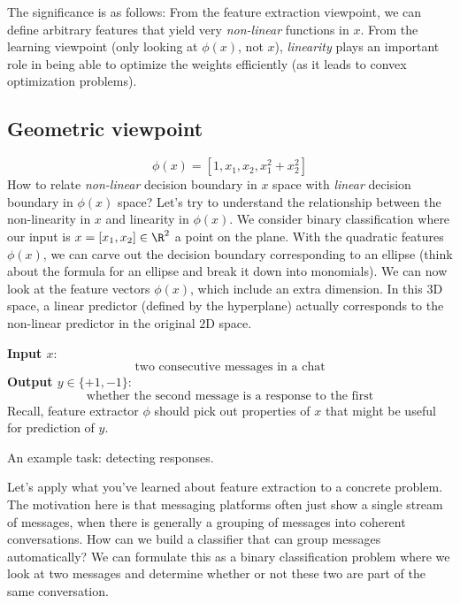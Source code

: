 The significance is as follows: From the feature extraction viewpoint, we can define arbitrary features that yield very \textit{non-linear} functions in $x$.
From the learning viewpoint (only looking at $\phi(x)$, not $x$),
\textit{linearity} plays an important role in being able to optimize the weights efficiently (as it leads to convex optimization problems).




\subsection{Geometric viewpoint}
\[
	\phi(x) = [1, x_1, x_2, x_1^2 + x_2^2]
\]
How to relate \textit{non-linear} decision boundary in $x$ space with \textit{linear} decision boundary in $\phi(x)$ space?
% 
Let's try to understand the relationship between the non-linearity in $x$ and linearity in $\phi(x).$
We consider binary classification where our input is $x = [x_1, x_2] \in \R^2$ a point on the plane.
With the quadratic features $\phi(x)$, we can carve out the decision boundary corresponding to an ellipse
(think about the formula for an ellipse and break it down into monomials).
% 
We can now look at the feature vectors $\phi(x)$, which include an extra dimension.
In this 3D space, a linear predictor (defined by the hyperplane)
actually corresponds to the non-linear predictor in the original $2$D space.

\begin{example}
    \noindent \textbf{Input $x$}:
    \[\text{two consecutive messages in a chat}\]
    \noindent \textbf{Output $y \in \{ +1, -1 \}$}:
    \[\text{whether the second message is a response to the first}\]
    Recall, feature extractor $\phi$ should pick out properties of $x$ that might be useful for prediction of $y$.
    \caption{
	    An example task: detecting responses.
	}
\end{example}

Let's apply what you've learned about feature extraction to a concrete problem.
The motivation here is that messaging platforms often just show a single stream of messages,
when there is generally a grouping of messages into coherent conversations.
How can we build a classifier that can group messages automatically?
We can formulate this as a binary classification problem where we look at two messages and determine whether or not these two are part of the same conversation. %

